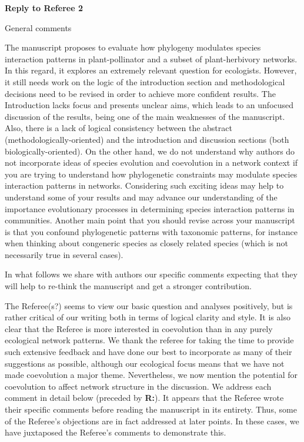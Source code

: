 \documentclass[12pt]{letter}
\newenvironment{refquote}{\bigskip \begin{it}}{\end{it}\smallskip}
\begin{document}
\clearpage

{\Large \bf Reply to Referee 2}


	\begin{refquote}
	General comments

	The manuscript proposes to evaluate how phylogeny modulates species interaction patterns in plant-pollinator and a subset of plant-herbivory networks. In this regard, it explores an extremely relevant question for ecologists. However, it still needs work on the logic of the introduction section and methodological decisions need to be revised in order to achieve more confident results. The Introduction lacks focus and presents unclear aims, which leads to an unfocused discussion of the results, being one of the main weaknesses of the manuscript. Also, there is a lack of logical consistency between the abstract (methodologically-oriented) and the introduction and discussion sections (both biologically-oriented). On the other hand, we do not understand why authors do not incorporate ideas of species evolution and coevolution in a network context if you are trying to understand how phylogenetic constraints may modulate species interaction patterns in networks. Considering such exciting ideas may help to understand some of your results and may advance our understanding of  the importance evolutionary processes in determining species interaction patterns in communities.
	Another main point that you should revise across your manuscript is that you confound phylogenetic patterns with taxonomic patterns, for instance when thinking about congeneric species as closely related species (which is not necessarily true in several cases).

	\smallskip

	In what follows we share with authors our specific comments expecting that they will help to re-think the manuscript and get a stronger contribution.

	\end{refquote}


	The Referee(s?) seems to view our basic question and analyses positively, but is rather critical of our  writing both in terms of logical clarity and style. It is also clear that the Referee is more interested in coevolution than in any purely ecological network patterns. We thank the referee for taking the time to provide such extensive feedback and have done our best to incorporate as many of their suggestions as possible, although our ecological focus means that we have not made coevolution a major theme. Nevertheless, we now mention the potential for coevolution to affect network structure in the discussion. We address each comment in detail below (preceded by \textbf{R:}). It appears that the Referee wrote their specific comments before reading the manuscript in its entirety. Thus, some of the Referee's objections are in fact addressed at later points. In these cases, we have juxtaposed the Referee's comments to demonstrate this.
\end{document}
